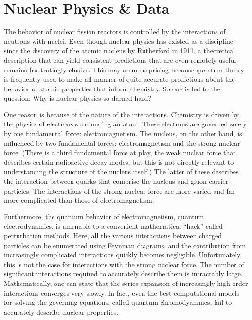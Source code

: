 \chapter{Nuclear Physics \& Data} \label{Sec:nuclearData}

The behavior of nuclear fission reactors is controlled by the interactions of neutrons with nuclei. Even though nuclear physics has existed as a discipline since the discovery of the atomic nucleus by Rutherford in 1911, a theoretical description that can yield consistent predictions that are even remotely useful remains frustratingly elusive. This may seem surprising because quantum theory is frequently used to make all manner of quite accurate predictions about the behavior of atomic properties that inform chemistry. So one is led to the question: Why is nuclear physics so darned hard?

One reason is because of the nature of the interactions. Chemistry is driven by the physics of electrons surrounding an atom. These electrons are governed solely by one fundamental force: electromagnetism. The nucleus, on the other hand, is influenced by two fundamental forces: electromagnetism and the strong nuclear force. (There is a third fundamental force at play, the weak nuclear force that describes certain radioactive decay modes, but this is not directly relevant to understanding the structure of the nucleus itself.)  The latter of these describes the interaction between quarks that comprise the nucleus and gluon carrier particles. The interactions of the strong nuclear force are more varied and far more complicated than those of electromagnetism. 

Furthermore, the quantum behavior of electromagnetism, quantum electrodynamics, is amenable to a convenient mathematical ``hack'' called perturbation methods. Here, all the various interactions between charged particles can be enumerated using Feynman diagrams, and the contribution from increasingly complicated interactions quickly becomes negligible. Unfortunately, this is not the case for interactions with the strong nuclear force. The number of significant interactions required to accurately describe them is intractably large. Mathematically, one can state that the series expansion of increasingly high-order interactions converges very slowly. In fact, even the best computational models for solving the governing equations, called quantum chromodyanmics, fail to accurately describe nuclear properties.

